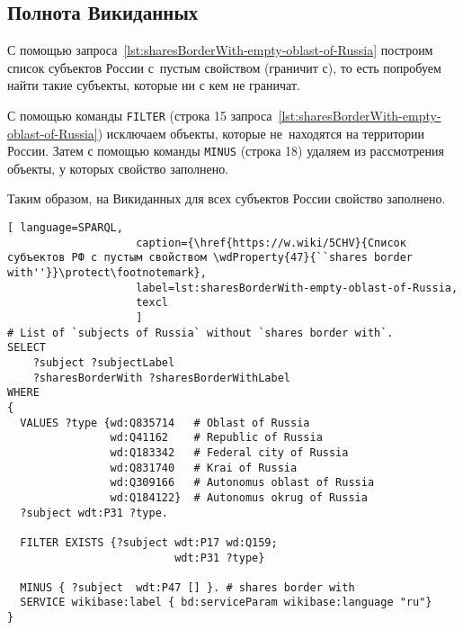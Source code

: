 \subsection{Полнота Викиданных}

С помощью запроса~\ref{lst:sharesBorderWith-empty-oblast-of-Russia} 
построим список субъектов России 
с~пустым свойством  (граничит с), 
то есть попробуем найти такие субъекты, которые ни с кем не граничат.

\label{question:q_subjects_of_Russia_2}


С помощью команды \lstinline|FILTER| (строка 15 запроса~\ref{lst:sharesBorderWith-empty-oblast-of-Russia}) 
исключаем объекты, которые не~находятся на территории России. 
Затем с помощью команды \lstinline|MINUS| (строка 18) удаляем из рассмотрения объекты, 
у которых свойство  заполнено.

Таким образом, на Викиданных для всех субъектов России свойство  заполнено.

\lstset{numbers=left, firstnumber=1, frame=single}
\begin{lstlisting}[ language=SPARQL, 
                    caption={\href{https://w.wiki/5CHV}{Список субъектов РФ с пустым свойством \wdProperty{47}{``shares border with''}}\protect\footnotemark},
                    label=lst:sharesBorderWith-empty-oblast-of-Russia,
                    texcl 
                    ]
# List of `subjects of Russia` without `shares border with`. 
SELECT 
    ?subject ?subjectLabel 
    ?sharesBorderWith ?sharesBorderWithLabel
WHERE
{
  VALUES ?type {wd:Q835714   # Oblast of Russia
                wd:Q41162    # Republic of Russia
                wd:Q183342   # Federal city of Russia
                wd:Q831740   # Krai of Russia
                wd:Q309166   # Autonomus oblast of Russia
                wd:Q184122}  # Autonomus okrug of Russia
  ?subject wdt:P31 ?type.
  
  FILTER EXISTS {?subject wdt:P17 wd:Q159; 
                          wdt:P31 ?type}
  
  MINUS { ?subject  wdt:P47 [] }. # shares border with 
  SERVICE wikibase:label { bd:serviceParam wikibase:language "ru"}
}
\end{lstlisting}%




